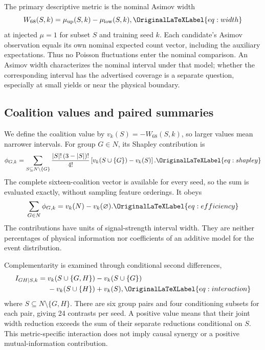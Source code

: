 \documentclass[aps,prd,reprint,superscriptaddress,nofootinbib,longbibliography,floatfix]{revtex4-2}
\let\label\OriginalLaTeXLabel
\newcommand{\W}{W_{68}}
\begin{document}
The primary descriptive metric is the nominal Asimov width
\begin{equation}
 \W(S,k)=\mu_{\mathrm{up}}(S,k)-\mu_{\mathrm{low}}(S,k),
 \label{eq:width}
\end{equation}
at injected $\mu=1$ for subset $S$ and training seed $k$. Each candidate's
Asimov observation equals its own nominal expected count vector, including
the auxiliary expectations. Thus no Poisson fluctuations enter the nominal
comparison. An Asimov width characterizes the nominal interval under that
model; whether the corresponding interval has the advertised coverage is a
separate question, especially at small yields or near the physical boundary.

\subsection{Coalition values and paired summaries}

We define the coalition value by $v_k(S)=-\W(S,k)$, so larger values mean
narrower intervals. For group $G\in N$, its Shapley contribution is
\begin{equation}
 \phi_{G,k}=\sum_{S\subseteq N\setminus\{G\}}
 \frac{|S|!\,(3-|S|)!}{4!}
 \left[v_k(S\cup\{G\})-v_k(S)\right].
 \label{eq:shapley}
\end{equation}
The complete sixteen-coalition vector is available for every seed, so the
sum is evaluated exactly, without sampling feature orderings. It obeys
\begin{equation}
 \sum_{G\in N}\phi_{G,k}=v_k(N)-v_k(\varnothing).
 \label{eq:efficiency}
\end{equation}
The contributions have units of signal-strength interval width. They are
neither percentages of physical information nor coefficients of an additive
model for the event distribution.

Complementarity is examined through conditional second differences,
\begin{align}
 I_{GH\mid S,k}={}&v_k(S\cup\{G,H\})-v_k(S\cup\{G\})\nonumber\\
                 &-v_k(S\cup\{H\})+v_k(S),
 \label{eq:interaction}
\end{align}
where $S\subseteq N\setminus\{G,H\}$. There are six group pairs and four
conditioning subsets for each pair, giving 24 contrasts per seed. A positive
value means that their joint width reduction exceeds the sum of their
separate reductions conditional on $S$. This metric-specific interaction
does not imply causal synergy or a positive mutual-information contribution.
\end{document}
